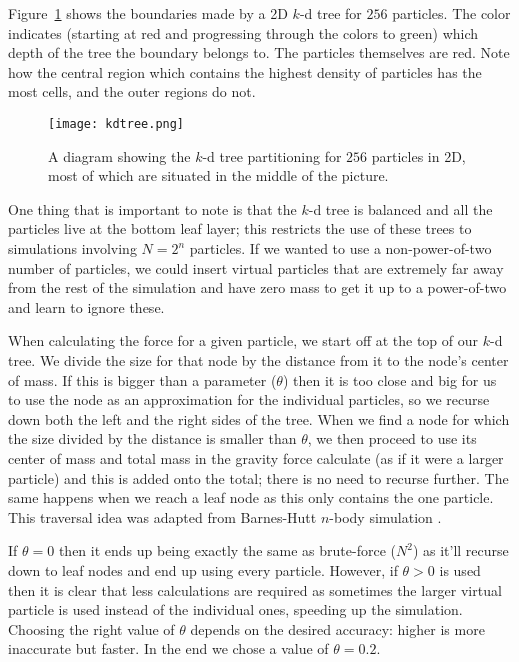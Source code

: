 \documentclass[11pt]{article}
\begin{document}
Figure~\ref{kdtree2d} shows the boundaries made by a 2D $k$-d tree for $256$ particles.
The color indicates (starting at red and progressing through the colors to green) which depth of the tree the boundary belongs to.
The particles themselves are red.
Note how the central region which contains the highest density of particles has the most cells, and the outer regions do not.

\begin{figure}
\begin{center}
\texttt{[image: kdtree.png]}
\caption{A diagram showing the $k$-d tree partitioning for $256$ particles in 2D, most of which are situated in the middle of the picture.}
\label{kdtree2d}
\end{center}
\end{figure}

One thing that is important to note is that the $k$-d tree is balanced and all the particles live at the bottom leaf layer; this restricts the use of these trees to simulations involving $N=2^n$ particles.
If we wanted to use a non-power-of-two number of particles, we could insert virtual particles that are extremely far away from the rest of the simulation and have zero mass to get it up to a power-of-two and learn to ignore these.

When calculating the force for a given particle, we start off at the top of our $k$-d tree.
We divide the size for that node by the distance from it to the node's center of mass.
If this is bigger than a parameter ($\theta$) then it is too close and big for us to use the node as an approximation for the individual particles, so we recurse down both the left and the right sides of the tree.
When we find a node for which the size divided by the distance is smaller than $\theta$, we then proceed to use its center of mass and total mass in the gravity force calculate (as if it were a larger particle) and this is added onto the total; there is no need to recurse further.
The same happens when we reach a leaf node as this only contains the one particle.
This traversal idea was adapted from Barnes-Hutt $n$-body simulation \cite{cos126}.

If $\theta = 0$ then it ends up being exactly the same as brute-force ($N^2$) as it'll recurse down to leaf nodes and end up using every particle.
However, if $\theta > 0$ is used then it is clear that less calculations are required as sometimes the larger virtual particle is used instead of the individual ones, speeding up the simulation.
Choosing the right value of $\theta$ depends on the desired accuracy: higher is more inaccurate but faster.
In the end we chose a value of $\theta = 0.2$.
\end{document}
